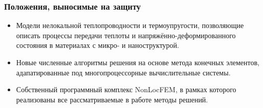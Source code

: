 \begin{frame}
    \frametitle{Положения, выносимые на защиту}
    \begin{itemize}
    	\justifying
        \item Модели нелокальной теплопроводности и термоупругости, позволяющие описать процессы передачи теплоты и напряжённо-деформированного состояния в материалах с микро- и наноструктурой.
        \item Новые численные алгоритмы решения на основе метода конечных элементов, адапатированные под многопроцессорные вычислительные системы.
        \item Собственный программный комплекс NonLocFEM, в рамках которого реализованы все рассматриваемые в работе методы решений.
    \end{itemize}
\end{frame}
